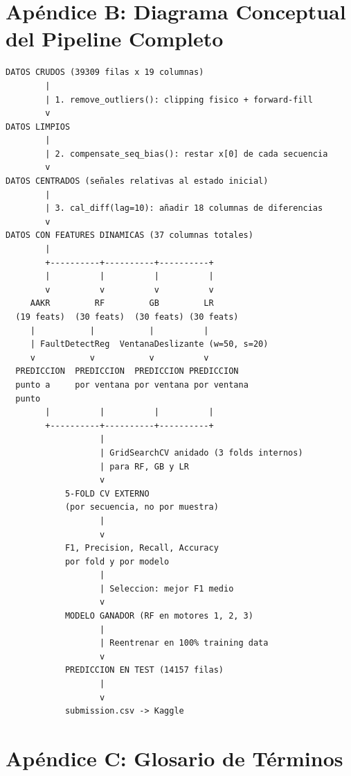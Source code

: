 \documentclass[12pt,a4paper]{article}
\begin{document}
\section*{Ap\'{e}ndice B: Diagrama Conceptual del Pipeline Completo}

\begin{center}
\begin{verbatim}
DATOS CRUDOS (39309 filas x 19 columnas)
        |
        | 1. remove_outliers(): clipping fisico + forward-fill
        v
DATOS LIMPIOS
        |
        | 2. compensate_seq_bias(): restar x[0] de cada secuencia
        v
DATOS CENTRADOS (señales relativas al estado inicial)
        |
        | 3. cal_diff(lag=10): añadir 18 columnas de diferencias
        v
DATOS CON FEATURES DINAMICAS (37 columnas totales)
        |
        +----------+----------+----------+
        |          |          |          |
        v          v          v          v
     AAKR         RF         GB         LR
  (19 feats)  (30 feats)  (30 feats) (30 feats)
     |           |           |          |
     | FaultDetectReg  VentanaDeslizante (w=50, s=20)
     v           v           v          v
  PREDICCION  PREDICCION  PREDICCION PREDICCION
  punto a     por ventana por ventana por ventana
  punto
        |          |          |          |
        +----------+----------+----------+
                   |
                   | GridSearchCV anidado (3 folds internos)
                   | para RF, GB y LR
                   v
            5-FOLD CV EXTERNO
            (por secuencia, no por muestra)
                   |
                   v
            F1, Precision, Recall, Accuracy
            por fold y por modelo
                   |
                   | Seleccion: mejor F1 medio
                   v
            MODELO GANADOR (RF en motores 1, 2, 3)
                   |
                   | Reentrenar en 100% training data
                   v
            PREDICCION EN TEST (14157 filas)
                   |
                   v
            submission.csv -> Kaggle
\end{verbatim}
\end{center}

\section*{Ap\'{e}ndice C: Glosario de T\'{e}rminos}
\end{document}
